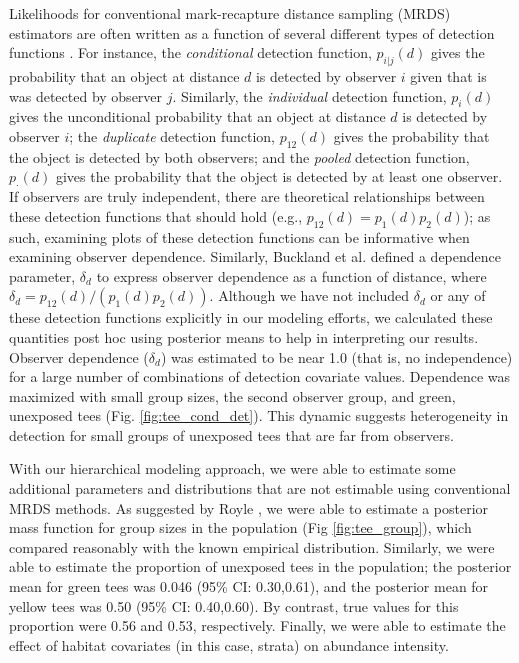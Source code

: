 \documentclass[10pt]{article}
\begin{document}
Likelihoods for conventional mark-recapture distance sampling (MRDS) estimators are often written as a function of several different types of detection functions \cite{LaakeBorchers2004}.  For instance, the {\it conditional} detection function, $p_{i|j}(d)$ gives the probability that an object at distance $d$ is detected by observer $i$ given that is was detected by observer $j$. Similarly, the {\it individual} detection function, $p_i(d)$ gives the unconditional probability that an object at distance $d$ is detected by observer $i$; the {\it duplicate} detection function, $p_{12}(d)$ gives the probability that the object is detected by both observers; and the {\it pooled} detection function, $p_\cdot(d)$ gives the probability that the object is detected by at least one observer.  If observers are truly independent, there are theoretical relationships between these detection functions that should hold (e.g., $p_{12}(d)=p_1(d)p_2(d)$); as such, examining plots of these detection functions can be informative when examining observer dependence.  Similarly, Buckland et al. \cite{BucklandEtAl2010} defined a dependence parameter, $\delta_d$ to express observer dependence as a function of distance, where $\delta_d=p_{12}(d)/(p_1(d)p_2(d))$.  Although we have not included $\delta_d$ or any of these detection functions explicitly in our modeling efforts, we calculated these quantities post hoc using posterior means to help in interpreting our results.  Observer dependence ($\delta_d$) was estimated to be near 1.0 (that is, no independence) for a large number of combinations of detection covariate values.  Dependence was maximized with small group sizes, the second observer group, and green, unexposed tees (Fig. \ref{fig:tee_cond_det}).  This dynamic suggests heterogeneity in detection for small groups of unexposed tees that are far from observers.

With our hierarchical modeling approach, we were able to estimate some additional parameters and distributions that are not estimable using conventional MRDS methods.  As suggested by Royle  \cite{Royle2008}, we were able to
estimate a posterior mass function for group sizes in the population (Fig \ref{fig:tee_group}), which compared reasonably with the known empirical distribution.  Similarly, we were able to estimate the proportion of unexposed tees in the population; the posterior mean for green tees was 0.046 (95\% CI: 0.30,0.61), and the posterior mean for yellow tees was 0.50 (95\% CI: 0.40,0.60).  By contrast, true values for this proportion were 0.56 and 0.53, respectively.  Finally, we were able to estimate the effect of habitat covariates (in this case, strata) on abundance intensity.  
\end{document}
